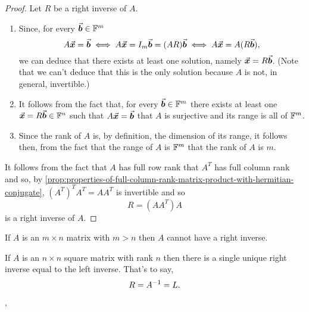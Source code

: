 \documentclass[../MathsNotesBase.tex]{subfiles}
\begin{document}
{	
	\bigskip
	\begin{proof}\nl[4]
		Let $R$ be a right inverse of $A$.
		\begin{enumerate}[label=(\roman*)]
			\item{Since, for every ${ \vec{\bm{b}} \in \mathbb{F}^{m} }$
				\[ A\vec{\bm{x}} =\vec{\bm{b}} \iff A\vec{\bm{x}} = I_m\vec{\bm{b}} = (AR)\vec{\bm{b}} \iff A\vec{\bm{x}} = A(R\vec{\bm{b}}), \]
				we can deduce that there exists at least one solution, namely ${ \vec{\bm{x}} = R\vec{\bm{b}} }$. (Note that we can't deduce that this is the only solution because $A$ is not, in general, invertible.)
			}
			\item{It follows from the fact that, for every ${ \vec{\bm{b}} \in \mathbb{F}^{m} }$ there exists at least one ${ \vec{\bm{x}} = R\vec{\bm{b}} \in \mathbb{F}^{n} }$ such that ${ A\vec{\bm{x}} = \vec{\bm{b}} }$ that $A$ is surjective and its range is all of $\mathbb{F}^{m}$.
			}
			\item{Since the rank of $A$ is, by definition, the dimension of its range, it follows then, from the fact that the range of $A$ is $\mathbb{F}^{m}$ that the rank of $A$ is $m$.
			}
		\end{enumerate}
		It follows from the fact that $A$ has full row rank that $A^T$ has full column rank and so, by \autoref{prop:properties-of-full-column-rank-matrix-product-with-hermitian-conjugate}, ${ (A^T)^T A^T = A A^T }$ is invertible and so
		\[ R = (A A^T) A \]
		is a right inverse of $A$.
	\end{proof}
	\begin{corollary}
		If $A$ is an ${ m \times n }$ matrix with ${ m > n }$ then $A$ cannot have a right inverse.
	\end{corollary}
	\begin{corollary}
		If $A$ is an ${ n \times n }$ square matrix with rank $n$ then there is a single unique right inverse equal to the left inverse. That's to say,
		\[ R = {A}^{-1} = L. \]
	\end{corollary}

	\sep
	\begin{exe}
	\end{exe}



}
\end{document}
